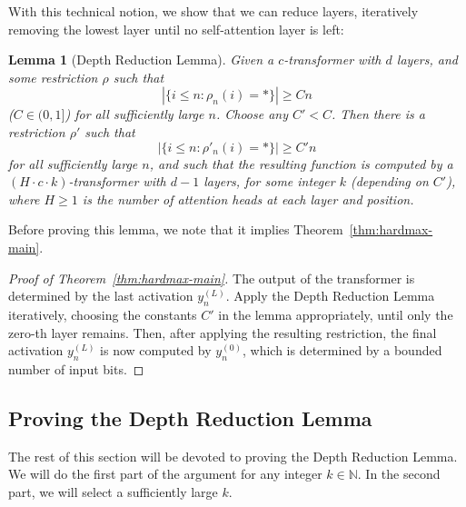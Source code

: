 \documentclass[11pt,a4paper]{article}
\newcounter{theorem}
\newtheorem{lemma}[theorem]{Lemma}
\begin{document}
With this technical notion, we show that we can reduce layers, iteratively removing the lowest layer until no self-attention layer is left:
\begin{lemma}[Depth Reduction Lemma]
Given a $c$-transformer with $d$ layers, and some restriction $\rho$ such that
\begin{equation}
|\{i \leq n: \rho_n(i) = *\}| \geq Cn
\end{equation}
($C \in (0,1]$)
for all sufficiently large $n$.
Choose any $C' < C$.
Then there is a restriction $\rho'$ 
such that
\begin{equation}
|\{i \leq n: \rho'_n(i) = *\}| \geq C'n
\end{equation}
for all sufficiently large $n$, 
and such that the resulting function is computed by a $(H\cdot c\cdot k)$-transformer with $d-1$ layers, for some integer $k$ (depending on $C'$), where $H \geq 1$ is the number of attention heads at each layer and position.
\end{lemma}
Before proving this lemma, we note that it implies Theorem~\ref{thm:hardmax-main}.
\begin{proof}[Proof of Theorem~\ref{thm:hardmax-main}]
The output of the transformer is determined by the last activation $y_{n}^{(L)}$.
Apply the Depth Reduction Lemma iteratively, choosing the constants $C'$ in the lemma appropriately, until only the zero-th layer remains.
Then, after applying the resulting restriction, the final activation $y_{n}^{(L)}$ is now computed by $y_{n}^{(0)}$, which is determined by a bounded number of input bits.
\end{proof}




\subsection{Proving the Depth Reduction Lemma}
The rest of this section will be devoted to proving the Depth Reduction Lemma.
We will do the first part of the argument for any integer $k \in \mathbb{N}$.
In the second part, we will select a sufficiently large $k$.
\end{document}
